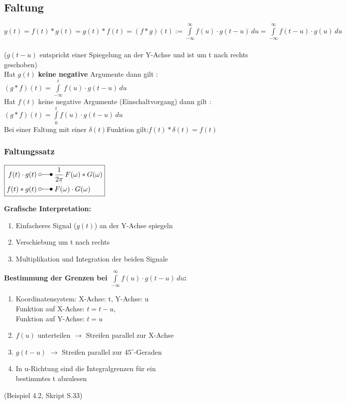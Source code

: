 	\subsection{Faltung}
	$y(t) = f(t)\ast g(t) = g(t) \ast f(t) = \boxed{ (f \ast g)(t) :=
	\int\limits_{-\infty}^\infty f(u) \cdot g(t-u) \, du} =
	\int\limits_{-\infty}^\infty f(t-u) \cdot g(u)\,du $ \\
	\\
	($g(t-u)$ entspricht einer Spiegelung an der Y-Achse und ist um t nach rechts geschoben)\\
	
	Hat $g\left(t\right)$ \textbf{keine negative} Argumente dann gilt :
	$\left(g \ast f \right)\left(t\right)=\int\limits_{-\infty}^t f(u) \cdot
	g(t-u)\,du$\\
	Hat $f\left(t\right)$ keine negative Argumente (Einschaltvorgang) dann gilt :
	$\left(g \ast f \right)\left(t\right)=\int\limits_{0}^t f(u) \cdot
	g(t-u)\,du$\\
	Bei einer Faltung mit einer $\delta\left(t\right)$Funktion
	gilt:$f\left(t\right) \ast \delta\left(t\right) = f\left(t\right)$
	
	\subsubsection{Faltungssatz }
				\begin{math}
				\boxed{
					\begin{aligned}
						f(t)\cdot g(t) \; &\laplace \; \frac{1}{2\pi} \, F(\omega) \ast G(\omega) \\
						f(t) \ast g(t) \; &\laplace \; F(\omega) \cdot G(\omega) \\
					\end{aligned}
				}
				\end{math}
		\begin{multicols}{2}
		\textbf{Grafische Interpretation:}
		\begin{enumerate}
  			\item Einfacheres Signal ($g(t)$) an der Y-Achse spiegeln
  			\item Verschiebung um t nach rechts
  			\item Multiplikation und Integration der beiden Signale
		\end{enumerate}
		\columnbreak
		\textbf{Bestimmung der Grenzen bei $\int\limits_{-\infty}^\infty f(u) \cdot g(t-u)\,du$:}
		\begin{enumerate}
		  \item Koordinatensystem: X-Achse: t, Y-Achse: u\\ 
		  Funktion auf X-Achse: $t = t - u$, \\
		  Funktion auf Y-Achse: $t = u$
		  \item $f(u)$ unterteilen $\rightarrow$ Streifen parallel zur X-Achse
		  \item $g(t-u)$ $\rightarrow$ Streifen parallel zur $45^{\circ}$-Geraden
		  \item In u-Richtung sind die Integralgrenzen für ein \\ bestimmtes t abzulesen
		\end{enumerate}
	\end{multicols}
	(Beispiel 4.2, Skript S.33)
	

